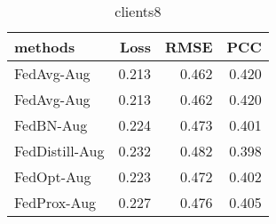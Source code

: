 \begin{table}
\caption{clients8}
\begin{tabular}{lrrr}
\toprule
methods & Loss & RMSE & PCC \\
\midrule
FedAvg-Aug & 0.213 & 0.462 & 0.420 \\
FedAvg-Aug & 0.213 & 0.462 & 0.420 \\
FedBN-Aug & 0.224 & 0.473 & 0.401 \\
FedDistill-Aug & 0.232 & 0.482 & 0.398 \\
FedOpt-Aug & 0.223 & 0.472 & 0.402 \\
FedProx-Aug & 0.227 & 0.476 & 0.405 \\
\bottomrule
\end{tabular}
\end{table}

